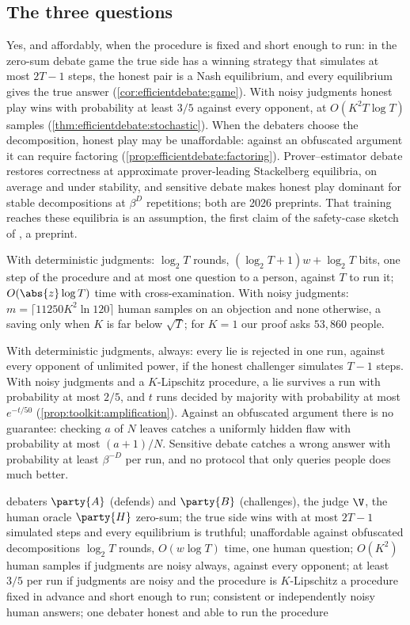\begin{refsection}
\section{The three questions}\label{sec:efficientdebate:questions}

\questionone Yes, and affordably, when the procedure is fixed and short enough to run: in the zero-sum debate game the true side has a winning strategy that simulates at most $2T-1$ steps, the honest pair is a Nash equilibrium, and every equilibrium gives the true answer (\cref{cor:efficientdebate:game}). With noisy judgments honest play wins with probability at least $3/5$ against every opponent, at $O(K^2T\log T)$ samples (\cref{thm:efficientdebate:stochastic}). When the debaters choose the decomposition, honest play may be unaffordable: against an obfuscated argument it can require factoring (\cref{prop:efficientdebate:factoring}). Prover--estimator debate restores correctness at approximate prover-leading Stackelberg equilibria, on average and under stability, and sensitive debate makes honest play dominant for stable decompositions at $\beta^D$ repetitions; both are 2026 preprints. That training reaches these equilibria is an assumption, the first claim of the safety-case sketch of \textcite{BuhlEtAl2025}, a preprint.

\questiontwo With deterministic judgments: $\log_2T$ rounds, $(\log_2T+1)w+\log_2T$ bits, one step of the procedure and at most one question to a person, against $T$ to run it; $O(\abs{z}\log T)$ time with cross-examination. With noisy judgments: $m=\lceil11250K^2\ln120\rceil$ human samples on an objection and none otherwise, a saving only when $K$ is far below $\sqrt T$; for $K=1$ our proof asks $53{,}860$ people.

\questionthree With deterministic judgments, always: every lie is rejected in one run, against every opponent of unlimited power, if the honest challenger simulates $T-1$ steps. With noisy judgments and a $K$-Lipschitz procedure, a lie survives a run with probability at most $2/5$, and $t$ runs decided by majority with probability at most $e^{-t/50}$ (\cref{prop:toolkit:amplification}). Against an obfuscated argument there is no guarantee: checking $a$ of $N$ leaves catches a uniformly hidden flaw with probability at most $(a+1)/N$. Sensitive debate catches a wrong answer with probability at least $\beta^{-D}$ per run, and no protocol that only queries people does much better.

{debaters $\party{A}$ (defends) and $\party{B}$ (challenges), the judge $\V$, the human oracle $\party{H}$}
{zero-sum; the true side wins with at most $2T-1$ simulated steps and every equilibrium is truthful; unaffordable against obfuscated decompositions}
{$\log_2T$ rounds, $O(w\log T)$ time, one human question; $O(K^2)$ human samples if judgments are noisy}
{always, against every opponent; at least $3/5$ per run if judgments are noisy and the procedure is $K$-Lipschitz}
{a procedure fixed in advance and short enough to run; consistent or independently noisy human answers; one debater honest and able to run the procedure}


\end{refsection}
